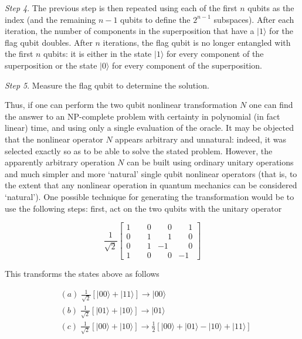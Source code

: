 \documentclass[12pt]{article}
\begin{document}
\medskip\noindent
{\it Step 4}. The previous step is then repeated using each of the first $n$ qubits as
the index (and the remaining $n-1$ qubits to define the $2^{n-1}$ subspaces).
After each iteration, the number of components in the superposition that have
a
$\vert 1 \rangle$
for the flag qubit doubles. After $n$ iterations, the flag qubit is no longer
entangled with the first $n$ qubits: it is either in the state
$\vert 1 \rangle$ for every component of the superposition or the state
$\vert 0 \rangle$ for every component of the superposition.

\medskip\noindent
{\it Step 5}. Measure the flag qubit to determine the solution.

\medskip\noindent
Thus, if one can perform the two qubit nonlinear transformation $N$ one can find
the answer to an NP-complete problem with certainty in polynomial (in fact
linear) time, and using only a single evaluation of the oracle. It may be
objected that the nonlinear operator $N$ appears arbitrary and unnatural:
indeed, it was selected exactly so as to be able to solve the stated problem.
However, the apparently arbitrary operation $N$ can be built using ordinary
unitary operations and much simpler and more `natural' single qubit nonlinear
operators (that is, to the extent that any nonlinear operation in quantum
mechanics can be considered `natural'). One possible technique for generating
the transformation would be to use the following steps: first, act on the two
qubits with the unitary operator

\begin{equation}
\frac{1}{\sqrt{2}}\left[
\begin{matrix}
1 & \phantom{-}0 & \phantom{-}0 & \phantom{-}1\\
0 & \phantom{-}1 & \phantom{-}1 & \phantom{-}0\\
0 & \phantom{-}1 & -1 & \phantom{-}0\\
1 & \phantom{-}0 & \phantom{-}0 &-1
\end{matrix}
\right]
\end{equation}

\goodbreak
This transforms the states above as follows%

\begin{align}
&  (a)\;\frac{1}{\sqrt{2}}\left[  |00\rangle+|11\rangle\right]
\longrightarrow|00\rangle\nonumber\\
&  (b)\;\frac{1}{\sqrt{2}}\left[  |01\rangle+|10\rangle\right]
\longrightarrow|01\rangle\\
&  (c)\;\frac{1}{\sqrt{2}}\left[  |00\rangle+|10\rangle\right]
\longrightarrow\frac{1}{2}\left[  |00\rangle+|01\rangle-|10\rangle
+|11\rangle\right] \nonumber
\end{align}
\end{document}
